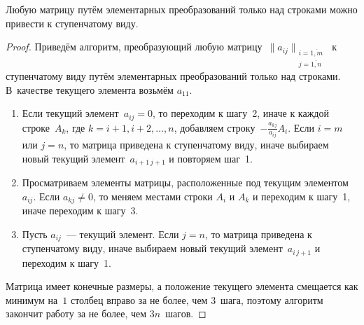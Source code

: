 \begin{theorem}
Любую матрицу путём элементарных преобразований только над строками можно привести к ступенчатому виду.
\end{theorem}
\begin{proof}
Приведём алгоритм, преобразующий любую матрицу~$\|a_{ij}\|_{\begin{smallmatrix}
i = \overline{1,m} \\
j = \overline{1,n}
\end{smallmatrix}}$ к ступенчатому виду путём элементарных преобразований только над строками.
В~качестве текущего элемента возьмём $a_{11}$.
\begin{enumerate}
	\item Если текущий элемент~$a_{ij} = 0$, то переходим к шагу~2, иначе к каждой строке~$A_k$, где $k = i + 1, i + 2, \ldots, n$, добавляем строку~$-\frac{a_{kj}}{a_{ij}} A_i$.
	Если $i = m$ или $j = n$, то матрица приведена к ступенчатому виду, иначе выбираем новый текущий элемент~$a_{i+1\, j+1}$ и повторяем шаг~1.
	\item Просматриваем элементы матрицы, расположенные под текущим элементом~$a_{ij}$.
	Если $a_{kj} \neq 0$, то меняем местами строки $A_i$ и $A_k$ и переходим к шагу~1, иначе переходим к шагу~3.
	\item Пусть $a_{ij}$~--- текущий элемент.
	Если $j = n$, то матрица приведена к ступенчатому виду, иначе выбираем новый текущий элемент~$a_{i\, j + 1}$ и переходим к шагу~1.
\end{enumerate}

Матрица имеет конечные размеры, а положение текущего элемента смещается как минимум на~$1$ столбец вправо за не более, чем $3$~шага, поэтому алгоритм закончит работу за не более, чем $3n$~шагов.
\end{proof}